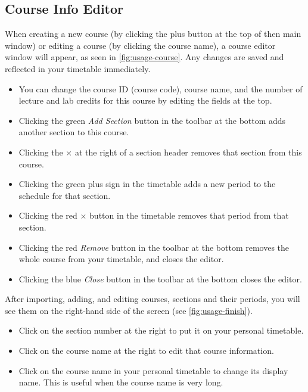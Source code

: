 \subsection{Course Info Editor}
\label{subsec:course}

When creating a new course
(by clicking the plus button at the top of then main window)
or editing a course
(by clicking the course name),
a course editor window will appear, as seen in \autoref{fig:usage-course}.
Any changes are saved and reflected in your timetable immediately.

\begin{itemize}
  \item
    You can change the course ID (course code),
    course name,
    and the number of lecture and lab credits for this course
    by editing the fields at the top.
  \item
    Clicking the green \emph{Add Section} button in the toolbar at the bottom
    adds another section to this course.
  \item
    Clicking the $\times$ at the right of a section header
    removes that section from this course.
  \item
    Clicking the green plus sign in the timetable
    adds a new period to the schedule for that section.
  \item
    Clicking the red $\times$ button in the timetable
    removes that period from that section.
  \item
    Clicking the red \emph{Remove} button in the toolbar at the bottom
    removes the whole course from your timetable,
    and closes the editor.
  \item
    Clicking the blue \emph{Close} button in the toolbar at the bottom
    closes the editor.
\end{itemize}

After importing, adding, and editing courses, sections and their periods,
you will see them on the right-hand side of the screen (see \autoref{fig:usage-finish}).

\begin{itemize}
  \item
    Click on the section number at the right to put it on your personal timetable.
  \item
    Click on the course name at the right to edit that course information.
  \item
    Click on the course name in your personal timetable
    to change its display name.
    This is useful when the course name is very long.
\end{itemize}

